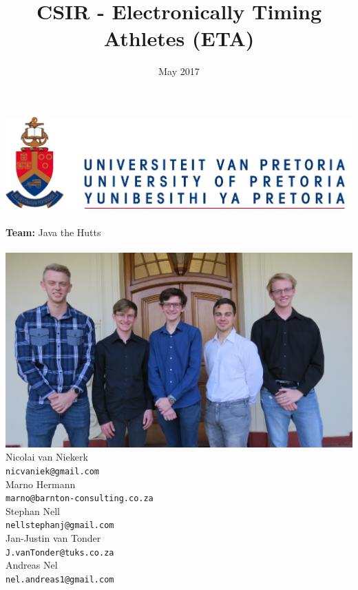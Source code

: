 \documentclass{article}
\title{CSIR - Electronically Timing Athletes (ETA)}
\date{May 2017}
\begin{document}
\makeatletter
    \begin{titlepage}
        \begin{center}
            \includegraphics[width=0.7\linewidth]{img/up.png}\\[4ex]
            {\huge \bfseries \@title }\\[2ex]
            {\LARGE \textbf{Team:} Java the Hutts}\\[2ex]
            {\LARGE \@date}\\[2ex]
            {\includegraphics[width=\linewidth]{img/team_photo.jpg}}\\[2ex]
            {\large  Nicolai van Niekerk\\ \texttt{nicvaniek@gmail.com}}\\[2ex]
            {\large  Marno Hermann\\ \texttt{marno@barnton-consulting.co.za}}\\[2ex]
            {\large  Stephan Nell\\ \texttt{nellstephanj@gmail.com}}\\[2ex]
            {\large  Jan-Justin van Tonder\\ \texttt{J.vanTonder@tuks.co.za}}\\[2ex]
            {\large  Andreas Nel\\ \texttt{nel.andreas1@gmail.com}}\\[2ex]
        \end{center}
        
    \end{titlepage}
\makeatother
\end{document}
